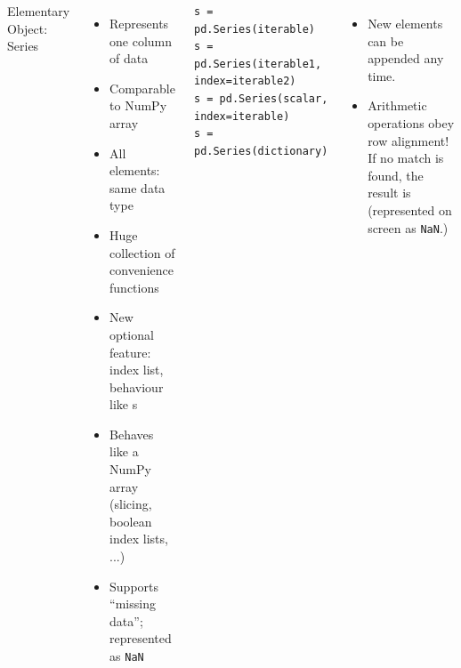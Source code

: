 
\begin{frame}[fragile]
%
\begin{columns}[T]
\begin{Large}
	{Elementary Object: Series}
	\vspace{6pt}
\end{Large}
\begin{itemize}
\item Represents one column of data
\item Comparable to NumPy array
\item All elements: same data type
\item Huge collection of convenience functions
\item New optional feature: index list, behaviour like s
\item Behaves like a NumPy array (slicing, boolean index lists, ...)
\item Supports \enquote{missing data}; represented as \texttt{NaN}
\end{itemize}
%
\begin{codebox}
\begin{verbatim}
s = pd.Series(iterable)
s = pd.Series(iterable1, index=iterable2)
s = pd.Series(scalar, index=iterable)
s = pd.Series(dictionary)
\end{verbatim}
\end{codebox}
%
\begin{itemize}
\item New elements can be appended any time.
\item Arithmetic operations obey row alignment! If no match is found, the result is  (represented on screen as \texttt{NaN}.)
\end{itemize}
\end{columns}
%
\end{frame}


